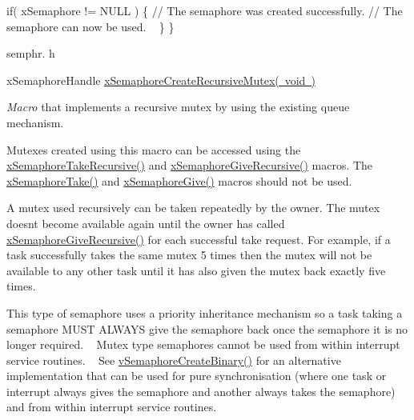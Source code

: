 \begin{DoxyPre}   if( xSemaphore != NULL )
   \{
       // The semaphore was created successfully.
       // The semaphore can now be used.  
~\newline
   \}
\}
\end{DoxyPre}


semphr. h 
\begin{DoxyPre}xSemaphoreHandle \mbox{\hyperlink{semphr_8h_a1bbc843be5a41ea83d2693b2189fc0f8}{xSemaphoreCreateRecursiveMutex( void )}}\end{DoxyPre}


{\itshape Macro} that implements a recursive mutex by using the existing queue mechanism.

Mutexes created using this macro can be accessed using the \mbox{\hyperlink{semphr_8h_ad395f4bba51eea6af3397d72bc079e4d}{x\+Semaphore\+Take\+Recursive()}} and \mbox{\hyperlink{semphr_8h_a398d66b17856c22dd49d39aaac42f105}{x\+Semaphore\+Give\+Recursive()}} macros. The \mbox{\hyperlink{semphr_8h_af116e436d2a5ae5bd72dbade2b5ea930}{x\+Semaphore\+Take()}} and \mbox{\hyperlink{semphr_8h_aae55761cabfa9bf85c8f4430f78c0953}{x\+Semaphore\+Give()}} macros should not be used.

A mutex used recursively can be \textquotesingle{}taken\textquotesingle{} repeatedly by the owner. The mutex doesn\textquotesingle{}t become available again until the owner has called \mbox{\hyperlink{semphr_8h_a398d66b17856c22dd49d39aaac42f105}{x\+Semaphore\+Give\+Recursive()}} for each successful \textquotesingle{}take\textquotesingle{} request. For example, if a task successfully \textquotesingle{}takes\textquotesingle{} the same mutex 5 times then the mutex will not be available to any other task until it has also \textquotesingle{}given\textquotesingle{} the mutex back exactly five times.

This type of semaphore uses a priority inheritance mechanism so a task \textquotesingle{}taking\textquotesingle{} a semaphore M\+U\+ST A\+L\+W\+A\+YS \textquotesingle{}give\textquotesingle{} the semaphore back once the semaphore it is no longer required. ~\newline
 Mutex type semaphores cannot be used from within interrupt service routines. ~\newline
 See \mbox{\hyperlink{semphr_8h_ae10bffadd26fbd5bcce76bf33a83ef30}{v\+Semaphore\+Create\+Binary()}} for an alternative implementation that can be used for pure synchronisation (where one task or interrupt always \textquotesingle{}gives\textquotesingle{} the semaphore and another always \textquotesingle{}takes\textquotesingle{} the semaphore) and from within interrupt service routines.

